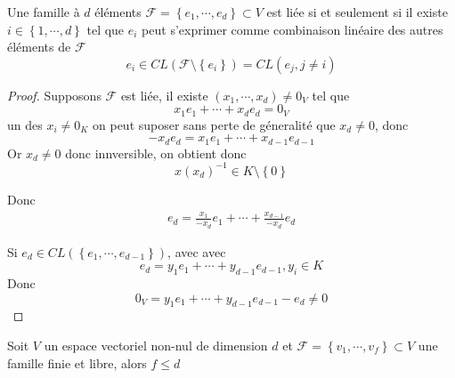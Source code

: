 \documentclass[../main.tex]{subfiles}
\begin{document}
\begin{propo}
Une famille à $d$ éléments $ \mathcal{F}= \left\{ e_1, \cdots, e_d \right\} \subset V$ est liée si et seulement si il existe $i \in \left\{ 1,\cdots, d \right\} $ tel que $e_i$ peut s'exprimer comme combinaison linéaire des autres éléments de $ \mathcal{F}$ 
\[ 
	e_i \in CL( \mathcal{F}\setminus \left\{ e_i \right\} ) = CL \left( e_j, j\neq i\right) 
\]
\end{propo}
\begin{proof}
	Supposons $\mathcal{F}$ est liée, il existe $ ( x_1,\cdots, x_d) \neq 0_V$ tel que 
	\[ 
	x_1 e_1 + \cdots + x_d e_d = 0_V
	\]
	un des $x_i \neq 0_K$ on peut suposer sans perte de géneralité que $x_d \neq 0$, donc
	\[ 
- x_d e_d = x_1e_1 + \cdots + x_{d-1} e_{d-1} 	
	\]
Or $x_d\neq 0$ donc innversible, on obtient donc
\[ 
x  ( x_{d} ) ^{-1} \in K \setminus \left\{ 0 \right\} 
\]

Donc
\begin{align*}
e_d = \frac{x_1}{-x_d} e_1 + \cdots  + \frac{x_{d-1} }{-x_d}e_d	
\end{align*}

Si $e_d \in CL \left( \left\{ e_1, \cdots, e_{d-1}  \right\}  \right) $, avec
avec
\[ 
e_d = y_1e_1 + \cdots + y_{d-1} e_{d-1} , y_i \in K
\]
Donc 
\[ 
0_V = y_1e_1 + \cdots + y_{d-1} e_{d-1}  -e_d \neq 0
\]

\end{proof}
\begin{thm}
	Soit $V$ un espace vectoriel non-nul de dimension $d$ et $\mathcal{F} = \left\{ v_1,\cdots,v_f \right\}\subset V $ une famille finie et libre, alors $f\leq d$
\end{thm}
\end{document}
